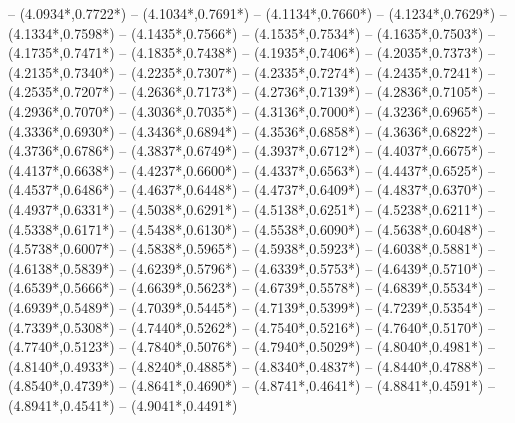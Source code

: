 {	-- ({4.0934*\dx},{0.7722*\dy})
	-- ({4.1034*\dx},{0.7691*\dy})
	-- ({4.1134*\dx},{0.7660*\dy})
	-- ({4.1234*\dx},{0.7629*\dy})
	-- ({4.1334*\dx},{0.7598*\dy})
	-- ({4.1435*\dx},{0.7566*\dy})
	-- ({4.1535*\dx},{0.7534*\dy})
	-- ({4.1635*\dx},{0.7503*\dy})
	-- ({4.1735*\dx},{0.7471*\dy})
	-- ({4.1835*\dx},{0.7438*\dy})
	-- ({4.1935*\dx},{0.7406*\dy})
	-- ({4.2035*\dx},{0.7373*\dy})
	-- ({4.2135*\dx},{0.7340*\dy})
	-- ({4.2235*\dx},{0.7307*\dy})
	-- ({4.2335*\dx},{0.7274*\dy})
	-- ({4.2435*\dx},{0.7241*\dy})
	-- ({4.2535*\dx},{0.7207*\dy})
	-- ({4.2636*\dx},{0.7173*\dy})
	-- ({4.2736*\dx},{0.7139*\dy})
	-- ({4.2836*\dx},{0.7105*\dy})
	-- ({4.2936*\dx},{0.7070*\dy})
	-- ({4.3036*\dx},{0.7035*\dy})
	-- ({4.3136*\dx},{0.7000*\dy})
	-- ({4.3236*\dx},{0.6965*\dy})
	-- ({4.3336*\dx},{0.6930*\dy})
	-- ({4.3436*\dx},{0.6894*\dy})
	-- ({4.3536*\dx},{0.6858*\dy})
	-- ({4.3636*\dx},{0.6822*\dy})
	-- ({4.3736*\dx},{0.6786*\dy})
	-- ({4.3837*\dx},{0.6749*\dy})
	-- ({4.3937*\dx},{0.6712*\dy})
	-- ({4.4037*\dx},{0.6675*\dy})
	-- ({4.4137*\dx},{0.6638*\dy})
	-- ({4.4237*\dx},{0.6600*\dy})
	-- ({4.4337*\dx},{0.6563*\dy})
	-- ({4.4437*\dx},{0.6525*\dy})
	-- ({4.4537*\dx},{0.6486*\dy})
	-- ({4.4637*\dx},{0.6448*\dy})
	-- ({4.4737*\dx},{0.6409*\dy})
	-- ({4.4837*\dx},{0.6370*\dy})
	-- ({4.4937*\dx},{0.6331*\dy})
	-- ({4.5038*\dx},{0.6291*\dy})
	-- ({4.5138*\dx},{0.6251*\dy})
	-- ({4.5238*\dx},{0.6211*\dy})
	-- ({4.5338*\dx},{0.6171*\dy})
	-- ({4.5438*\dx},{0.6130*\dy})
	-- ({4.5538*\dx},{0.6090*\dy})
	-- ({4.5638*\dx},{0.6048*\dy})
	-- ({4.5738*\dx},{0.6007*\dy})
	-- ({4.5838*\dx},{0.5965*\dy})
	-- ({4.5938*\dx},{0.5923*\dy})
	-- ({4.6038*\dx},{0.5881*\dy})
	-- ({4.6138*\dx},{0.5839*\dy})
	-- ({4.6239*\dx},{0.5796*\dy})
	-- ({4.6339*\dx},{0.5753*\dy})
	-- ({4.6439*\dx},{0.5710*\dy})
	-- ({4.6539*\dx},{0.5666*\dy})
	-- ({4.6639*\dx},{0.5623*\dy})
	-- ({4.6739*\dx},{0.5578*\dy})
	-- ({4.6839*\dx},{0.5534*\dy})
	-- ({4.6939*\dx},{0.5489*\dy})
	-- ({4.7039*\dx},{0.5445*\dy})
	-- ({4.7139*\dx},{0.5399*\dy})
	-- ({4.7239*\dx},{0.5354*\dy})
	-- ({4.7339*\dx},{0.5308*\dy})
	-- ({4.7440*\dx},{0.5262*\dy})
	-- ({4.7540*\dx},{0.5216*\dy})
	-- ({4.7640*\dx},{0.5170*\dy})
	-- ({4.7740*\dx},{0.5123*\dy})
	-- ({4.7840*\dx},{0.5076*\dy})
	-- ({4.7940*\dx},{0.5029*\dy})
	-- ({4.8040*\dx},{0.4981*\dy})
	-- ({4.8140*\dx},{0.4933*\dy})
	-- ({4.8240*\dx},{0.4885*\dy})
	-- ({4.8340*\dx},{0.4837*\dy})
	-- ({4.8440*\dx},{0.4788*\dy})
	-- ({4.8540*\dx},{0.4739*\dy})
	-- ({4.8641*\dx},{0.4690*\dy})
	-- ({4.8741*\dx},{0.4641*\dy})
	-- ({4.8841*\dx},{0.4591*\dy})
	-- ({4.8941*\dx},{0.4541*\dy})
	-- ({4.9041*\dx},{0.4491*\dy})
}
